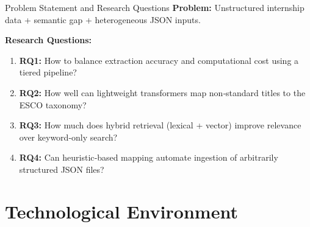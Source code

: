 \documentclass[aspectratio=169, 10pt]{beamer}
\begin{document}
    \begin{frame}{Problem Statement and Research Questions}
        \textbf{Problem:} Unstructured internship data + semantic gap + heterogeneous JSON inputs.
        \vspace{0.5cm}

        \textbf{Research Questions:}
        \begin{enumerate}
            \item \textbf{RQ1:} How to balance extraction accuracy and computational cost using a tiered pipeline?
            \item \textbf{RQ2:} How well can lightweight transformers map non‑standard titles to the ESCO taxonomy?
            \item \textbf{RQ3:} How much does hybrid retrieval (lexical + vector) improve relevance over keyword‑only search?
            \item \textbf{RQ4:} Can heuristic‑based mapping automate ingestion of arbitrarily structured JSON files?
        \end{enumerate}
    \end{frame}

    \section{Technological Environment}
\end{document}

